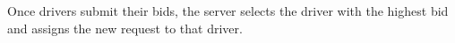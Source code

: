 Once drivers submit their bids, the server selects the driver with the highest bid and assigns the new request to that driver.






